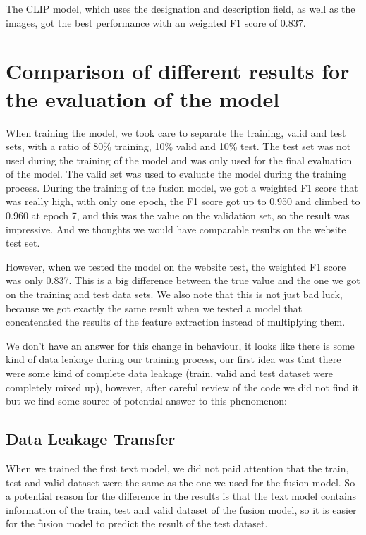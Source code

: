 The CLIP model, which uses the designation and description field, as well as the images, got the best performance with an weighted F1 score of 0.837.



\section{Comparison of different results for the evaluation of the model}

When training the model, we took care to separate the training, valid and test sets, with a ratio of 80\% training, 10\% valid and 10\% test. The test set was not used during the training of the model and was only used for the final evaluation of the model. The valid set was used to evaluate the model during the training process. During the training of the fusion model, we got a weighted F1 score that was really high, with only one epoch, the F1 score got up to 0.950 and climbed to 0.960 at epoch 7, and this was the value on the validation set, so the result was impressive. And we thoughts we would have comparable results on the website test set.


However, when we tested the model on the website test, the weighted F1 score was only 0.837. This is a big difference between the true value and the one we got on the training and test data sets. We also note that this is not just bad luck, because we got exactly the same result when we tested a model that concatenated the results of the feature extraction instead of multiplying them.

We don't have an answer for this change in behaviour, it looks like there is some kind of data leakage during our training process, our first idea was that there were some kind of complete data leakage (train, valid and test dataset were completely mixed up), however, after careful review of the code we did not find it  but we find some source of potential answer to this phenomenon:

\subsection{Data Leakage Transfer}

When we trained the first text model, we did not paid attention that the train, test and valid dataset were the same as the one we used for the fusion model. So a potential reason for the difference in the results is that the text model contains information of the train, test and valid dataset of the fusion model, so it is easier for the fusion model to predict the result of the test dataset.

